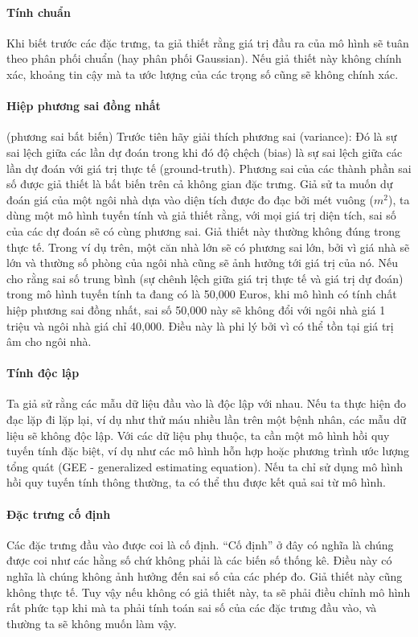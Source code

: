 \paragraph{Tính chuẩn}
Khi biết trước các đặc trưng, ta giả thiết rằng giá trị đầu ra của mô hình sẽ tuân theo phân phối chuẩn (hay phân phối Gaussian). Nếu giả thiết này không chính xác, khoảng tin cậy mà ta ước lượng của các trọng số cũng sẽ không chính xác.

\paragraph{Hiệp phương sai đồng nhất} (phương sai bất biến)
Trước tiên hãy giải thích phương sai (variance): Đó là sự sai lệch giữa các lần dự đoán trong khi đó độ chệch (bias) là sự sai lệch giữa các lần dự đoán với giá trị thực tế (ground-truth).
Phương sai của các thành phần sai số được giả thiết là bất biến trên cả không gian đặc trưng. Giả sử ta muốn dự đoán giá của một ngôi nhà dựa vào diện tích được đo đạc bởi mét vuông ($m^2$), ta dùng một mô hình tuyến tính và giả thiết rằng, với mọi giá trị diện tích, sai số của các dự đoán sẽ có cùng phương sai. Giả thiết này thường không đúng trong thực tế. Trong ví dụ trên, một căn nhà lớn sẽ có phương sai lớn, bởi vì giá nhà sẽ lớn và thường số phòng của ngôi nhà cũng sẽ ảnh hưởng tới giá trị của nó. Nếu cho rằng sai số trung bình (sự chênh lệch giữa giá trị thực tế và giá trị dự đoán) trong mô hình tuyến tính ta đang có là 50,000 Euros, khi mô hình có tính chất hiệp phương sai đồng nhất, sai số 50,000 này sẽ không đổi với ngôi nhà giá 1 triệu và ngôi nhà giá chỉ 40,000. Điều này là phi lý bởi vì có thể tồn tại giá trị âm cho ngôi nhà.

\paragraph{Tính độc lập}
Ta giả sử rằng các mẫu dữ liệu đầu vào là độc lập với nhau. Nếu ta thực hiện đo đạc lặp đi lặp lại, ví dụ như thử máu nhiều lần trên một bệnh nhân, các mẫu dữ liệu sẽ không độc lập. Với các dữ liệu phụ thuộc, ta cần một mô hình hồi quy tuyến tính đặc biệt, ví dụ như các mô hình hỗn hợp hoặc phương trình ước lượng tổng quát (GEE - generalized estimating equation). Nếu ta chỉ sử dụng mô hình hồi quy tuyến tính thông thường, ta có thể thu được kết quả sai từ mô hình.

\paragraph{Đặc trưng cố định}
Các đặc trưng đầu vào được coi là cố định. ``Cố định'' ở đây có nghĩa là chúng được coi như các hằng số chứ không phải là các biến số thống kê. Điều này có nghĩa là chúng không ảnh hưởng đến sai số của các phép đo. Giả thiết này cũng không thực tế. Tuy vậy nếu không có giả thiết này, ta sẽ phải điều chỉnh mô hình rất phức tạp khi mà ta phải tính toán sai số của các đặc trưng đầu vào, và thường ta sẽ không muốn làm vậy. 

